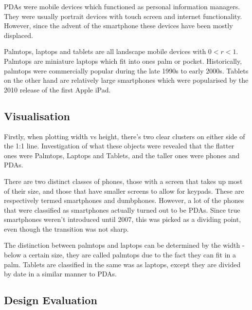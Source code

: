 \documentclass[conference]{IEEEtran}
\begin{document}
PDAs were mobile devices which functioned as personal information managers. They
were usually portrait devices with touch screen and internet functionality.
However, since the advent of the smartphone these devices have been mostly
displaced.

Palmtops, laptops and tablets are all landscape mobile devices with $0<r<1$.
Palmtops are miniature laptops which fit into ones palm or pocket. Historically,
palmtops were commercially popular during the late 1990s to early 2000s.
Tablets on the other hand are relatively large smartphones which were
popularised by the 2010 release of the first Apple iPad.
\subsection{Visualisation}

Firstly, when plotting width vs height, there's two clear clusters on either side of the 1:1 line. Investigation of what these objects were revealed that the flatter ones were Palmtops, Laptops and Tablets, and the taller ones were phones and PDAs.

There are two distinct classes of phones, those with a screen that takes up most of their size, and those that have smaller screens to allow for keypads. These are respectively termed smartphones and dumbphones. However, a lot of the phones that were classified as smartphones actually turned out to be PDAs. Since true smartphones weren't introduced until 2007, this was picked as a dividing point, even though the transition was not sharp.

The distinction between palmtops and laptops can be determined by the width - below a certain size, they are called palmtops due to the fact they can fit in a palm. Tablets are classified in the same was as laptops, except they are divided by date in a similar manner to PDAs.


\subsection{Design Evaluation}
\end{document}
